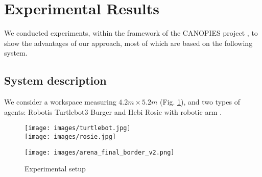 
\section{Experimental Results}\label{sec:experimental}
We conducted experiments, within the framework of the CANOPIES project \cite{canopies}, to show the advantages of our approach, most of which are based on the following system.
\subsection{System description}\label{subsec:exp-system}
We consider a workspace measuring $4.2\si{m} \times 5.2\si{m}$ (Fig. \ref{fig:workspace}), and two types of agents: Robotis Turtlebot3 Burger \cite{turtlebot} and Hebi Rosie with robotic arm \cite{rosie}.
\begin{figure}
    \centering
    \begin{minipage}{0.5\linewidth}
        \centering
        \vspace{0.14cm}
        \texttt{[image: images/turtlebot.jpg]}\\
        \vspace{0.05cm}
        \texttt{[image: images/rosie.jpg]}
         \label{fig:robots}
    \end{minipage}%
    \begin{minipage}{0.5\linewidth}
        \centering
        \texttt{[image: images/arena\_final\_border\_v2.png]}
         \label{fig:workspace}
    \end{minipage}
    \caption{Experimental setup}
\end{figure}
